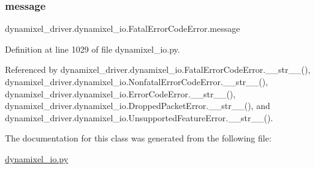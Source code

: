 \subsubsection{\texorpdfstring{message}{message}}
{\footnotesize\ttfamily dynamixel\+\_\+driver.\+dynamixel\+\_\+io.\+Fatal\+Error\+Code\+Error.\+message}



Definition at line 1029 of file dynamixel\+\_\+io.\+py.



Referenced by dynamixel\+\_\+driver.\+dynamixel\+\_\+io.\+Fatal\+Error\+Code\+Error.\+\_\+\+\_\+str\+\_\+\+\_\+(), dynamixel\+\_\+driver.\+dynamixel\+\_\+io.\+Nonfatal\+Error\+Code\+Error.\+\_\+\+\_\+str\+\_\+\+\_\+(), dynamixel\+\_\+driver.\+dynamixel\+\_\+io.\+Error\+Code\+Error.\+\_\+\+\_\+str\+\_\+\+\_\+(), dynamixel\+\_\+driver.\+dynamixel\+\_\+io.\+Dropped\+Packet\+Error.\+\_\+\+\_\+str\+\_\+\+\_\+(), and dynamixel\+\_\+driver.\+dynamixel\+\_\+io.\+Unsupported\+Feature\+Error.\+\_\+\+\_\+str\+\_\+\+\_\+().



The documentation for this class was generated from the following file\+:\begin{DoxyCompactItemize}
\item 
\hyperlink{dynamixel__io_8py}{dynamixel\+\_\+io.\+py}\end{DoxyCompactItemize}
